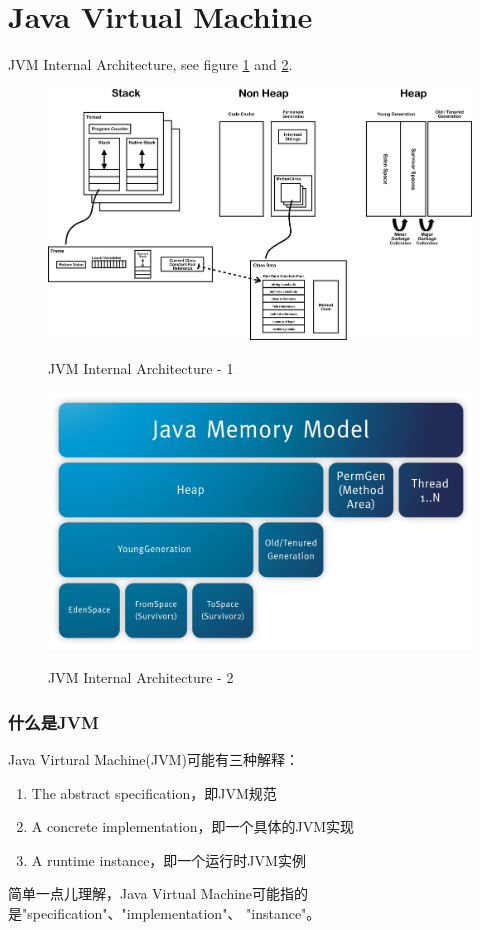 \documentclass[a4paper,11pt]{article}
\begin{document}
\part[JVM]{Java Virtual Machine}
JVM Internal Architecture, see figure \ref{fig:jvm} and \ref{fig:jvm2}.
\begin{figure}
  \centering
  \includegraphics[width=\textwidth]{picturedir/JVMInternalArchitecture.png}\\
  \caption{JVM Internal Architecture - 1}\label{fig:jvm}
\end{figure}

\begin{figure}
  \centering
  \includegraphics[width=\textwidth]{picturedir/JVMRuntimeDataArea.png}\\
  \caption{JVM Internal Architecture - 2}\label{fig:jvm2}
\end{figure}

\section[什么是JVM]{什么是JVM}
Java Virtural Machine(JVM)可能有三种解释：
\begin{enumerate}
  \item The abstract specification，即JVM规范
  \item A concrete implementation，即一个具体的JVM实现
  \item A runtime instance，即一个运行时JVM实例
\end{enumerate}
简单一点儿理解，Java Virtual Machine可能指的是"specification"、"implementation"、
"instance"。
\end{document}
